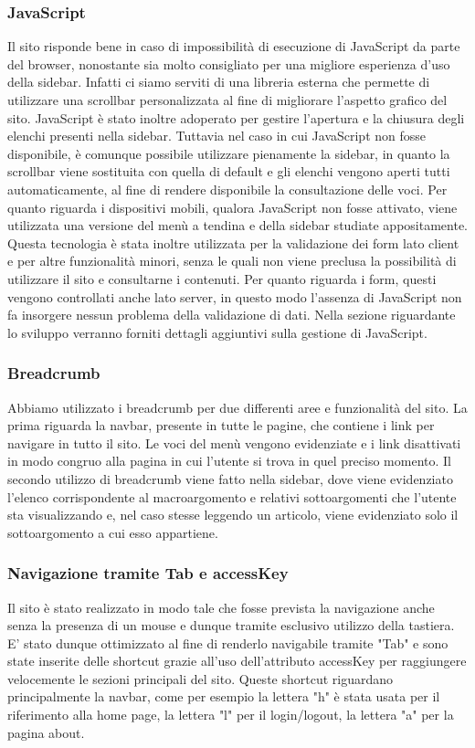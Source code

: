 \documentclass[12pt]{article}
\begin{document}
	\subsubsection{JavaScript}
	Il sito risponde bene in caso di impossibilità di esecuzione di JavaScript da parte del browser, nonostante sia molto consigliato per una migliore esperienza d'uso della sidebar. Infatti ci siamo serviti di una libreria esterna che permette di utilizzare una scrollbar personalizzata al fine di migliorare l'aspetto grafico del sito. JavaScript è stato inoltre adoperato per gestire l'apertura e la chiusura degli elenchi presenti nella sidebar. Tuttavia nel caso in cui JavaScript non fosse disponibile, è comunque possibile utilizzare pienamente la sidebar, in quanto la scrollbar viene sostituita con quella di default e gli elenchi vengono aperti tutti automaticamente, al fine di rendere disponibile la consultazione delle voci. Per quanto riguarda i dispositivi mobili, qualora JavaScript non fosse attivato, viene utilizzata una versione del menù a tendina e della sidebar studiate appositamente. 
	Questa tecnologia è stata inoltre utilizzata per la validazione dei form lato client e per altre funzionalità minori, senza le quali non viene preclusa la possibilità di utilizzare il sito e consultarne i contenuti. Per quanto riguarda i form, questi vengono controllati anche lato server, in questo modo l'assenza di JavaScript non fa insorgere nessun problema della validazione di dati. Nella sezione  riguardante lo sviluppo verranno forniti dettagli aggiuntivi sulla gestione di JavaScript.
	\subsubsection{Breadcrumb}
	Abbiamo utilizzato i breadcrumb per due differenti aree e funzionalità del sito. La prima riguarda la navbar, presente in tutte le pagine, che contiene i link per navigare in tutto il sito. Le voci del menù vengono evidenziate e i link disattivati in modo congruo alla pagina in cui l'utente si trova in quel preciso momento. Il secondo utilizzo di breadcrumb viene fatto nella sidebar, dove viene evidenziato l'elenco corrispondente al macroargomento e relativi sottoargomenti che l'utente sta visualizzando e, nel caso stesse leggendo un articolo, viene evidenziato solo il sottoargomento a cui esso appartiene.
	\subsubsection{Navigazione tramite Tab e accessKey}
	Il sito è stato realizzato in modo tale che fosse prevista la navigazione anche senza la presenza di un mouse e dunque tramite esclusivo utilizzo della tastiera. E' stato dunque ottimizzato al fine di renderlo navigabile tramite "Tab" e sono state inserite delle shortcut grazie all'uso dell'attributo accessKey per raggiungere velocemente le sezioni principali del sito. Queste shortcut riguardano principalmente la navbar, come per esempio la lettera "h" è stata usata per il riferimento alla home page, la lettera "l" per il login/logout, la lettera "a" per la pagina about.
	
\end{document}
